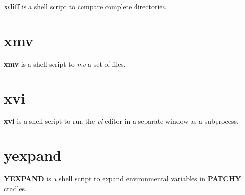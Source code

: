 {\bf xdiff} is a shell script to compare complete directories.

\section{xmv}

{\bf xmv} is a shell script to {\it mv} a set of files.

\section{xvi}

{\bf xvi} is a shell script to run the {\it vi} editor in a separate
window as a subprocess.

\section{yexpand}

{\bf YEXPAND} is a shell script to expand environmental variables in
{\bf PATCHY} cradles. 

